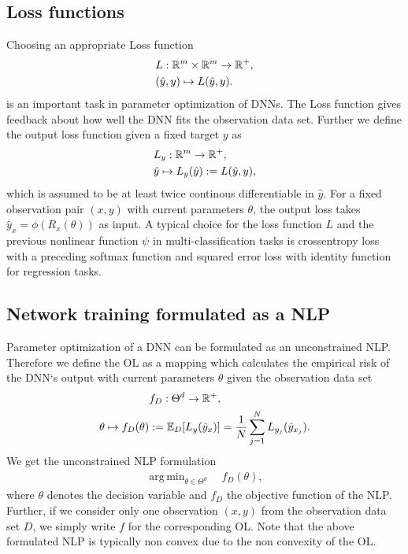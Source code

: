 \documentclass[conference]{IEEEtran}
\DeclareMathOperator*{\argmin}{arg\,min}
\begin{document}
	\subsection{Loss functions}
	\noindent
	Choosing an appropriate Loss function
	\begin{align}
	&L:\mathbb{R}^{m}\times \mathbb{R}^{m}\rightarrow \mathbb{R}^{+}, \notag\\
	&(\hat{y}, y)\mapsto L(\hat{y}, y).
	\end{align}
	is an important task in parameter optimization of DNNs. The Loss function gives feedback about how well the DNN fits the observation data set. Further we define the output loss function given a fixed target $y$ as
	\begin{align}
	&L_{y}:\mathbb{R}^{m}\rightarrow \mathbb{R}^{+}, \notag\\
	&\hat{y}\mapsto L_{y}(\hat{y}) := L(\hat{y}, y),
	\end{align}
	which is assumed to be at least twice continous differentiable in $\hat{y}$. For a fixed observation pair $(x, y)$ with current parameters $\theta$, the output loss takes $\hat{y}_{x} = \phi(R_{x}(\theta))$ as input. A typical choice for the loss function $L$ and the previous nonlinear function $\psi$ in multi-classification tasks is crossentropy loss with a preceding softmax function and squared error loss with identity function for regression tasks.
	
	
	
	\subsection{Network training formulated as a NLP}
	\noindent
	Parameter optimization of a DNN can be formulated as an unconstrained NLP. Therefore we define the OL as a mapping which calculates the empirical risk of the DNN`s output with current parameters $\theta$ given the observation data set
	\begin{align}
	&f_{D}:\Theta^{d}\rightarrow\mathbb{R}^{+}, \notag\\
	\theta\mapsto f_{D}(\theta) &:= \mathbb{E}_{D}[L_{y}(\hat{y}_{x})] =  \frac{1}{N}\sum_{j = 1}^{N}L_{y_{j}}(\hat{y}_{x_{j}}).
	\end{align}
	We get the unconstrained NLP formulation
	\begin{align}
	\argmin_{\theta\in\Theta^{d}}\quad f_{D}(\theta),
	\end{align}
	where $\theta$ denotes the decision variable and $f_{D}$ the objective function of the NLP.
	Further, if we consider only one observation $(x, y)$ from the observation data set $D$, we simply write  $f$ for the corresponding OL. Note that the above formulated NLP is typically non convex due to the non convexity of the OL.
	
\end{document}

